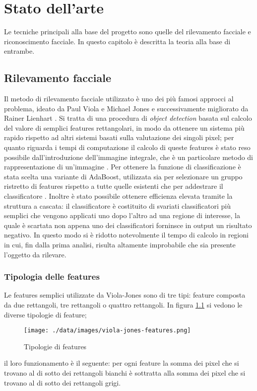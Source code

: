 \chapter{Stato dell'arte}
Le tecniche principali alla base del progetto sono quelle del rilevamento facciale e riconoscimento facciale. In questo capitolo è descritta la teoria alla base di entrambe.

\section{Rilevamento facciale}
Il metodo di rilevamento facciale utilizzato è uno dei più famosi approcci al problema, ideato da Paul Viola e Michael Jones \cite{viola2001rapid} e successivamente migliorato da Rainer Lienhart \cite{lienhart2002extended}. Si tratta di una procedura di \textit{object detection} basata sul calcolo del valore di semplici features rettangolari, in modo da ottenere un sistema più rapido rispetto ad altri sistemi basati sulla valutazione dei singoli pixel; per quanto riguarda i tempi di computazione il calcolo di queste features è stato reso possibile dall'introduzione dell'immagine integrale, che è un particolare metodo di rappresentazione di un'immagine \cite{viola2001rapid}. Per ottenere la funzione di classificazione è stata scelta una variante di AdaBoost, utilizzata sia per selezionare un gruppo ristretto di features rispetto a tutte quelle esistenti che per addestrare il classificatore \cite{viola2001rapid}. Inoltre è stato possibile ottenere efficienza elevata tramite la struttura a cascata: il classificatore è costituito di svariati classificatori più semplici che vengono applicati uno dopo l'altro ad una regione di interesse, la quale è scartata non appena uno dei classificatori forninsce in output un risultato negativo. In questo modo si è ridotto notevolmente il tempo di calcolo in regioni in cui, fin dalla prima analisi, risulta altamente improbabile che sia presente l'oggetto da rilevare.

\subsection{Tipologia delle features}
Le features semplici utilizzate da Viola-Jones \cite{viola2001rapid} sono di tre tipi: feature composta da due rettangoli, tre rettangoli o quattro rettangoli. In figura \ref{features} si vedono le diverse tipologie di feature; 
\begin{figure}
	\centering
	\texttt{[image: ./data/images/viola-jones-features.png]}
	\caption{Tipologie di features \cite{viola2001rapid}}
	\label{features}
\end{figure}
il loro funzionamento è il seguente: per ogni feature la somma dei pixel che si trovano al di sotto dei rettangoli bianchi è sottratta alla somma dei pixel che si trovano al di sotto dei rettangoli grigi.

